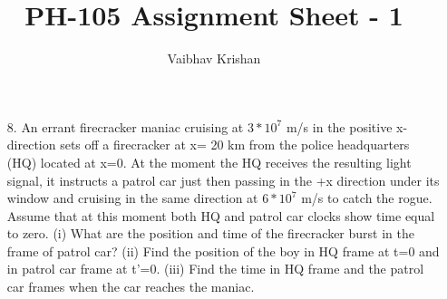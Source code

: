 \documentclass[10pt, a4paper]{article}
\begin{document}
\title{PH-105 Assignment Sheet - 1}
\author{Vaibhav Krishan}
\date{}
\maketitle
\begin{enumerate}
\item[8.]{An errant firecracker maniac cruising at \begin{math} 3*10^7 \end{math} m/s in the positive x- direction sets off a firecracker at x= 20 km from the police headquarters (HQ) located at x=0. At the moment the HQ receives the resulting light signal, it instructs a patrol car just then passing in the +x direction under its window and cruising in the same direction at \begin{math} 6*10^7 \end{math} m/s to catch the rogue. Assume that at this moment both HQ and patrol car clocks show time equal to zero. (i) What are the position and time of the firecracker burst in the frame of patrol car? (ii) Find the position of the boy in HQ frame at t=0 and in patrol car frame at t’=0. (iii) Find the time in HQ frame and the patrol car frames when the car reaches the maniac.\\


}
\end{enumerate}
\end{document}
